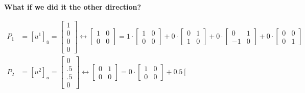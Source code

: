 %
\textbf{What if we did it the other direction?}
   
    \begin{align*}
       {P}_{1}&=[{u}^{1}]_{ \overline{u} }=\left[ \begin{array}{c}
            1\\
            0\\
            0\\
            0
        \end{array}\right]   \leftrightarrow \left[ \begin{array}{rr}
            1 & 0\\
            0 & 0
            \end{array} \right] = 1 \cdot  \left[\begin{array}{rr}
            1 & 0\\
            0 & 0
            \end{array} \right]+ 0 \cdot \left[\begin{array}{rr}
            0 & 1\\
            1 & 0
            \end{array} \right] + 0 \cdot \left[\begin{array}{rr}
            0 & 1\\
            -1 & 0
            \end{array} \right] + 0 \cdot \left[\begin{array}{rr}
            0 & 0\\
            0 & 1
        \end{array} \right]
\\
        {P}_{2}&=[{u}^{2}]_{ \overline{u}}=\left[\begin{array}{r}
            0\\
            .5\\
           .5\\
            0
        \end{array}\right] \leftrightarrow \left[ \begin{array}{rr}
            0& 1\\
            0 & 0
            \end{array} \right] = 0 \cdot  \left[\begin{array}{rr}
            1 & 0\\
            0 & 0
            \end{array} \right]+ 0.5  \left[\begin{array}{rr}

\end{array}
\end{align*}
